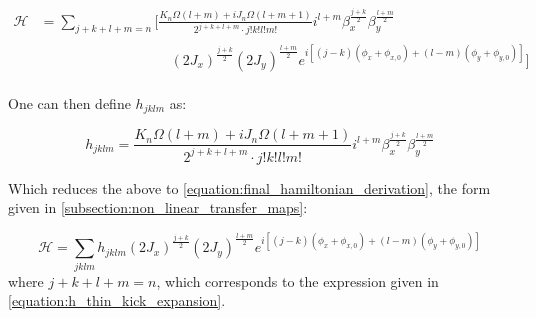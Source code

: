\begin{equation}
    \begin{aligned}
        \mathcal{H} &= \sum_{j + k + l + m= n} \biggl[ \frac{K_n \Omega(l+m) + i J_n \Omega(l+m+1)}{2^{j+k+l+m} \cdot j! k! l! m!} i^{l+m} \beta_x^{\frac{j+k}{2}} \beta_y^{\frac{l+m}{2}} \\
                    & \begin{aligned}
                        \phantom{\biggl[ \sum_{j + k + l + m = n} \quad}
                    & (2 J_x)^{\frac{j+k}{2}} (2 J_y)^{\frac{l+m}{2}} e^{i \left[ (j-k) (\phi_x + \phi_{x,0}) + (l-m) (\phi_y + \phi_{y,0}) \right]}
                                \biggr]
                        \end{aligned}
    \end{aligned}
    \label{equation:hamiltonian_multinomial_expanded}
\end{equation}

One can then define \(h_{jklm}\) as:

\begin{equation}
    h_{jklm} = \frac{K_n \Omega(l+m) + i J_n \Omega(l+m+1)} {2^{j+k+l+m} \cdot j! k! l! m!} i^{l+m} \beta_x^{\frac{j+k}{2}} \beta_y^{\frac{l+m}{2}}
\end{equation}

Which reduces the above to \cref{equation:final_hamiltonian_derivation}, the form given in \cref{subsection:non_linear_transfer_maps}:

\begin{equation}
    \mathcal{H} = \sum_{jklm} h_{jklm} (2 J_x)^{\frac{j+k}{2}} (2J_y)^{\frac{l+m}{2}} e^{i\left[ (j-k)(\phi_x + \phi_{x,0}) + (l-m)(\phi_y + \phi_{y,0}) \right]}
    \label{equation:final_hamiltonian_derivation}
\end{equation}
where \(j+k+l+m=n\), which corresponds to the expression given in \cref{equation:h_thin_kick_expansion}.

\glsresetall                                     %
